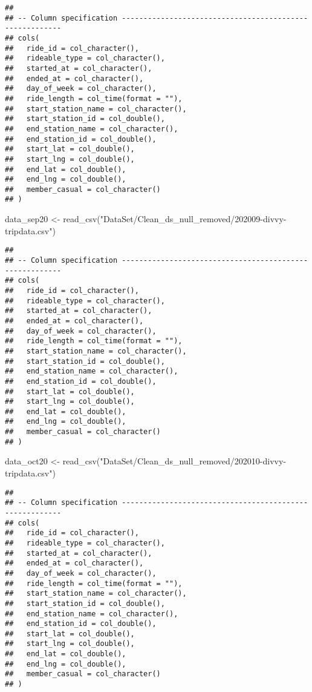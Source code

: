 \documentclass[
]{article}
\newenvironment{Shaded}{\begin{snugshade}}{\end{snugshade}}
\newcommand{\FunctionTok}[1]{\textcolor[rgb]{0.00,0.00,0.00}{#1}}
\newcommand{\NormalTok}[1]{#1}
\newcommand{\OtherTok}[1]{\textcolor[rgb]{0.56,0.35,0.01}{#1}}
\newcommand{\StringTok}[1]{\textcolor[rgb]{0.31,0.60,0.02}{#1}}
\begin{document}
\begin{verbatim}
## 
## -- Column specification --------------------------------------------------------
## cols(
##   ride_id = col_character(),
##   rideable_type = col_character(),
##   started_at = col_character(),
##   ended_at = col_character(),
##   day_of_week = col_character(),
##   ride_length = col_time(format = ""),
##   start_station_name = col_character(),
##   start_station_id = col_double(),
##   end_station_name = col_character(),
##   end_station_id = col_double(),
##   start_lat = col_double(),
##   start_lng = col_double(),
##   end_lat = col_double(),
##   end_lng = col_double(),
##   member_casual = col_character()
## )
\end{verbatim}

\begin{Shaded}
\begin{Highlighting}[]
\NormalTok{data\_sep20 }\OtherTok{\textless{}{-}} \FunctionTok{read\_csv}\NormalTok{(}\StringTok{"DataSet/Clean\_ds\_null\_removed/202009{-}divvy{-}tripdata.csv"}\NormalTok{)}
\end{Highlighting}
\end{Shaded}

\begin{verbatim}
## 
## -- Column specification --------------------------------------------------------
## cols(
##   ride_id = col_character(),
##   rideable_type = col_character(),
##   started_at = col_character(),
##   ended_at = col_character(),
##   day_of_week = col_character(),
##   ride_length = col_time(format = ""),
##   start_station_name = col_character(),
##   start_station_id = col_double(),
##   end_station_name = col_character(),
##   end_station_id = col_double(),
##   start_lat = col_double(),
##   start_lng = col_double(),
##   end_lat = col_double(),
##   end_lng = col_double(),
##   member_casual = col_character()
## )
\end{verbatim}

\begin{Shaded}
\begin{Highlighting}[]
\NormalTok{data\_oct20 }\OtherTok{\textless{}{-}} \FunctionTok{read\_csv}\NormalTok{(}\StringTok{"DataSet/Clean\_ds\_null\_removed/202010{-}divvy{-}tripdata.csv"}\NormalTok{)}
\end{Highlighting}
\end{Shaded}

\begin{verbatim}
## 
## -- Column specification --------------------------------------------------------
## cols(
##   ride_id = col_character(),
##   rideable_type = col_character(),
##   started_at = col_character(),
##   ended_at = col_character(),
##   day_of_week = col_character(),
##   ride_length = col_time(format = ""),
##   start_station_name = col_character(),
##   start_station_id = col_double(),
##   end_station_name = col_character(),
##   end_station_id = col_double(),
##   start_lat = col_double(),
##   start_lng = col_double(),
##   end_lat = col_double(),
##   end_lng = col_double(),
##   member_casual = col_character()
## )
\end{verbatim}
\end{document}

